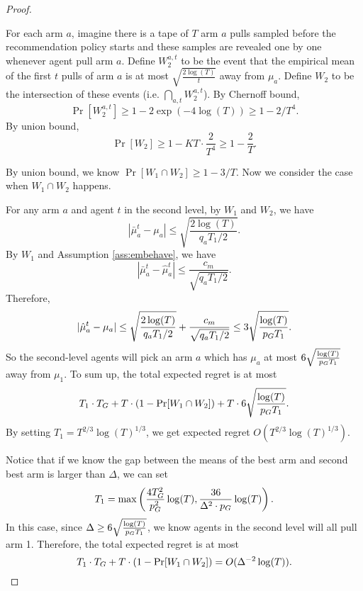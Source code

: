 \begin{proof}
\begin{itemize}
For each arm $a$, imagine there is a tape of $T$ arm $a$ pulls sampled before the recommendation policy starts and these samples are revealed one by one whenever agent pull arm $a$. Define $W^{a,t}_2$ to be the event that the empirical mean of the first $t$ pulls of arm $a$ is at most $\sqrt{\frac{2\log(T)}{t}}$ away from $\mu_a$. Define $W_2$ to be the intersection of these events (i.e. $\bigcap_{a,t} W^{a,t}_2$).
By Chernoff bound,
\[
\Pr[W^{a,t}_2] \geq 1 - 2\exp(-4\log(T)) \geq 1-2/T^4.
\]
By union bound, 
\[
\Pr[W_2] \geq 1 - KT \cdot \frac{2}{T^4} \geq 1 - \frac{2}{T}.
\]
\end{itemize}

By union bound, we know $\Pr[W_1 \cap W_2] \geq 1 - 3/T$. Now we consider the case when $W_1 \cap W_2$ happens. 

For any arm $a$ and agent $t$ in the second level, by $W_1$ and $W_2$, we have
\[
|\bar{\mu}^t_a - \mu_a| \leq \sqrt{\frac{2\log(T)}{q_aT_1 /2}}.
\]
By $W_1$ and Assumption \ref{ass:embehave}, we have
\[
|\bar{\mu}^t_a - \hat{\mu}^t_a| \leq \frac{c_m}{\sqrt{q_aT_1/2}}.
\]
Therefore,
\[
|\hat{\mu}^t_a - \mu_a|\leq \sqrt{\frac{2\log(T)}{q_aT_1 /2}}+\frac{c_m}{\sqrt{q_aT_1/2}} \leq 3 \sqrt{\frac{\log(T)}{p_G T_1 }}.
\]
So the second-level agents will pick an arm $a$ which has $\mu_a$ at most $6 \sqrt{\frac{\log(T)}{p_G T_1 }}$ away from $\mu_1$. To sum up, the total expected regret is at most 
\[
T_1 \cdot T_G + T \cdot (1-\Pr[W_1 \cap W_2]) + T \cdot  6 \sqrt{\frac{\log(T)}{p_G T_1 }}.
\]
By setting $T_1 = T^{2/3}\log(T)^{1/3}$, we get expected regret $O(T^{2/3}\log(T)^{1/3})$.

Notice that if we know the gap between the means of the best arm and second best arm is larger than $\Delta$, we can set 
\[
T_1 = \max\left( \frac{4T_G^2}{p_G^2}\log(T), \frac{36 }{\Delta^2 \cdot p_G} \log(T) \right).
\]
In this case, since $\Delta \geq 6 \sqrt{\frac{\log(T)}{p_G T_1 }}$, we know agents in the second level will all pull arm 1. Therefore, the total expected regret is at most
\[
T_1 \cdot T_G + T \cdot (1- \Pr[W_1 \cap W_2]) = O(\Delta^{-2} \log(T)).
\]
\end{proof}

